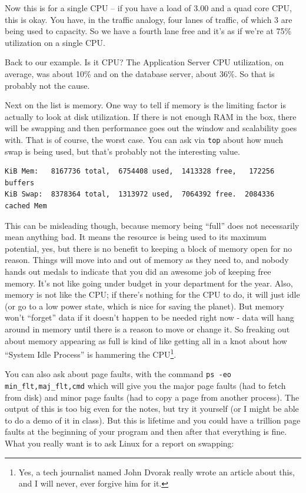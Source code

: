 \documentclass[a4paper]{report}
\begin{document}
Now this is for a single CPU -- if you have a load of 3.00 and a quad core CPU, this is okay. You have, in the traffic analogy, four lanes of traffic, of which 3 are being used to capacity. So we have a fourth lane free and it's as if we're at 75\% utilization on a single CPU.


Back to our example. Is it CPU? The Application Server CPU utilization, on average, was about 10\% and on the database server, about 36\%. So that is probably not the cause. 

Next on the list is memory. One way to tell if memory is the limiting factor is actually to look at disk utilization. If there is not enough RAM in the box, there will be swapping and then performance goes out the window and scalability goes with. That is of course, the worst case. You can ask via \texttt{top} about how much swap is being used, but that's probably not the interesting value. 

\begin{verbatim}
KiB Mem:   8167736 total,  6754408 used,  1413328 free,   172256 buffers
KiB Swap:  8378364 total,  1313972 used,  7064392 free.  2084336 cached Mem
\end{verbatim}

This can be misleading though, because memory being ``full'' does not necessarily mean anything bad. It means the resource is being used to its maximum potential, yes, but there is no benefit to keeping a block of memory open for no reason. Things will move into and out of memory as they need to, and nobody hands out medals to indicate that you did an awesome job of keeping free memory. It's not like going under budget in your department for the year.  Also, memory is not like the CPU; if there's nothing for the CPU to do, it will just idle (or go to a low power state, which is nice for saving the planet). But memory won't ``forget'' data if it doesn't happen to be needed right now - data will hang around in memory until there is a reason to move or change it. So freaking out about memory appearing as full is kind of like getting all in a knot about how ``System Idle Process'' is hammering the CPU\footnote{Yes, a tech journalist named John Dvorak really wrote an article about this, and I will never, ever forgive him for it.}.

You can also ask about page faults, with the command \texttt{ps -eo min\_flt,maj\_flt,cmd} which will give you the major page faults (had to fetch from disk) and minor page faults (had to copy a page from another process). The output of this is too big even for the notes, but try it yourself (or I might be able to do a demo of it in class). But this is lifetime and you could have a trillion page faults at the beginning of your program and then after that everything is fine. What you really want is to ask Linux for a report on swapping:
\end{document}
